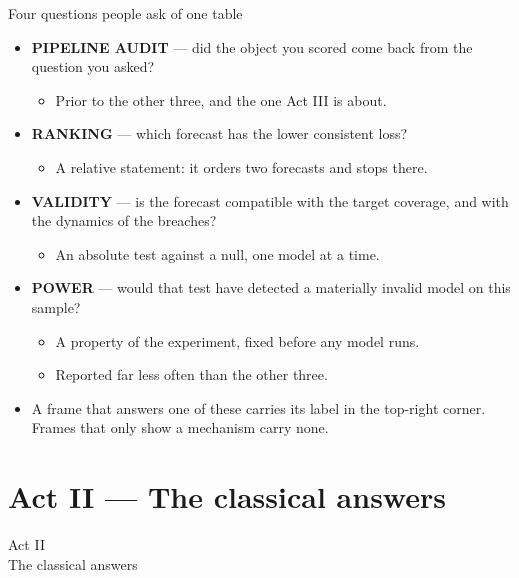 \documentclass[9pt, aspectratio=169, t]{beamer}
\begin{document}
\begin{frame}{Four questions people ask of one table}
  \begin{itemize}
    \item \textbf{\textcolor{MainBlue}{PIPELINE AUDIT}} --- did the object you scored
          come back from the question you asked?
      \begin{itemize}
        \item Prior to the other three, and the one Act III is about.
      \end{itemize}
    \item \textbf{\textcolor{MainBlue}{RANKING}} --- which forecast has the lower
          consistent loss?
      \begin{itemize}
        \item A relative statement: it orders two forecasts and stops there.
      \end{itemize}
    \item \textbf{\textcolor{MainBlue}{VALIDITY}} --- is the forecast compatible with
          the target coverage, and with the dynamics of the breaches?
      \begin{itemize}
        \item An absolute test against a null, one model at a time.
      \end{itemize}
    \item \textbf{\textcolor{IDAred}{POWER}} --- would that test have detected a
          materially invalid model on this sample?
      \begin{itemize}
        \item A property of the experiment, fixed before any model runs.
        \item Reported far less often than the other three.
      \end{itemize}
  \end{itemize}
  \begin{block}{}
    \begin{itemize}
      \item A frame that answers one of these carries its label in the top-right
            corner. Frames that only show a mechanism carry none.
    \end{itemize}
  \end{block}
\end{frame}

\section{Act II --- The classical answers}
\begin{frame}[plain]
  \centering\vfill
  {\Large\textcolor{IDAred}{Act II}}\\[0.4em]
  {\large The classical answers}
  \vfill
\end{frame}
\end{document}
